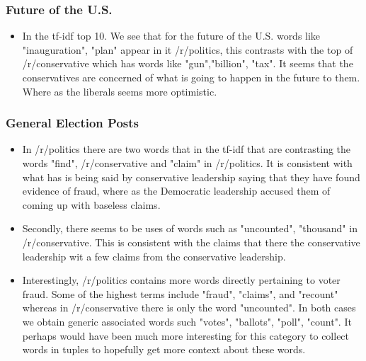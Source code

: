 \documentclass[11pt]{article}
\begin{document}
\subsubsection*{Future of the U.S.}
\begin{itemize}
    \item In the tf-idf top 10. We see that for the future of the U.S. words like "inauguration", "plan" appear in it /r/politics, this contrasts with the top of /r/conservative which has words like "gun","billion", "tax". It seems that the conservatives are concerned of what is going to happen in the future to them. Where as the liberals seems more optimistic. 
\end{itemize}

\subsubsection*{General Election Posts}
\begin{itemize}
    \item In /r/politics there are two words that in the tf-idf that are contrasting the words "find", /r/conservative and "claim" in /r/politics. It is consistent with what has is being said by conservative leadership saying that they have found evidence of fraud, where as the Democratic leadership accused them of coming up with baseless claims. 
    \item Secondly, there seems to be uses of words such as "uncounted", "thousand" in /r/conservative. This is consistent with the claims that there the conservative leadership wit a few claims from the conservative leadership.
    \item Interestingly, /r/politics contains more words directly pertaining to voter fraud. Some of the highest terms include "fraud", "claims", and "recount" whereas in /r/conservative there is only the word "uncounted". In both cases we obtain generic associated words such "votes", "ballots", "poll", "count". It perhaps would have been much more interesting for this category to collect words in tuples to hopefully get more context about these words.
\end{itemize}
\end{document}
